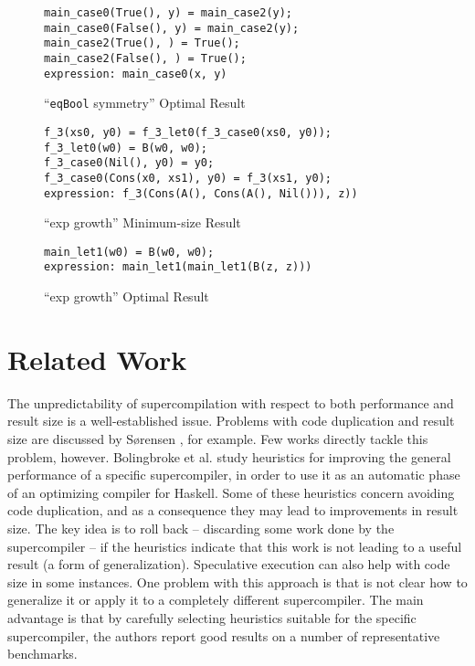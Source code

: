 \documentclass[submission,copyright,creativecommons]{eptcs}
\begin{document}
\begin{figure}
\begin{lstlisting}
main_case0(True(), y) = main_case2(y);
main_case0(False(), y) = main_case2(y);
main_case2(True(), ) = True();
main_case2(False(), ) = True();
expression: main_case0(x, y)
\end{lstlisting}
\caption{``\texttt{eqBool} symmetry'' Optimal Result}
\label{fig:BoolEqSymResult}
\end{figure}

\begin{figure}
\begin{lstlisting}
f_3(xs0, y0) = f_3_let0(f_3_case0(xs0, y0));
f_3_let0(w0) = B(w0, w0);
f_3_case0(Nil(), y0) = y0;
f_3_case0(Cons(x0, xs1), y0) = f_3(xs1, y0);
expression: f_3(Cons(A(), Cons(A(), Nil())), z))
\end{lstlisting}
\caption{``exp growth'' Minimum-size Result}
\label{fig:ExpGrowthMinResult}
\end{figure}

\begin{figure}
\begin{lstlisting}
main_let1(w0) = B(w0, w0);
expression: main_let1(main_let1(B(z, z)))
\end{lstlisting}
\caption{``exp growth'' Optimal Result}
\label{fig:ExpGrowthOptResult}
\end{figure}

\section{Related Work}

The unpredictability of supercompilation with respect to both performance and
result size is a well-established issue.
Problems with code duplication and result size are discussed by S{\o}rensen \cite{Sorensen1994TurchinSupercompiler}, 
for example.
Few works directly tackle this problem, however.
Bolingbroke et al. \cite{bolingbroke2011improving} study heuristics for improving the general
performance of a specific supercompiler, in order to use it as an automatic phase of an optimizing 
compiler for Haskell.
Some of these heuristics concern avoiding code duplication, and as a consequence they may
lead to improvements in result size.
The key idea is to roll back -- discarding some work done by the supercompiler -- if the heuristics
indicate that this work is not leading to a useful result (a form of generalization).
Speculative execution can also help with code size in some instances.
One problem with this approach is that is not clear how to generalize it or
apply it to a completely different supercompiler.
The main advantage is that by carefully selecting heuristics suitable for the specific
supercompiler, the authors report good results on a number of representative benchmarks.
\end{document}
